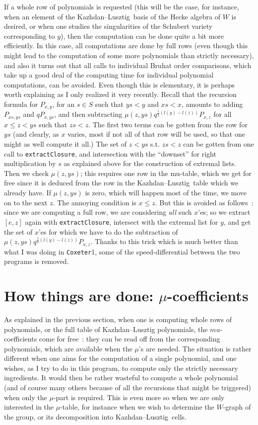 \documentclass[11pt]{article}
\newcommand{\coxeter}{{\tt Coxeter}}
\newcommand{\kl}{Kazh\-dan--Lusz\-tig}
\newcommand{\klpol}{Kazh\-dan--Lusz\-tig po\-ly\-no\-mial}
\begin{document}
If a whole row of polynomials is requested (this will be the case, for 
instance, when an element of the \kl\ basis of the Hecke algebra of $W$ is 
desired, or when one studies the singularities of the Schubert variety
corresponding to $y$), then the computation can be done quite a bit more
efficiently. In this case, all computations are done by full rows (even though
this might lead to the computation of some more polynomials than strictly
necessary), and also it turns out that all calls to individual Bruhat order
comparisons, which take up a good deal of the computing time for individual
polynomial computations, can be avoided. Even though this is elementary, it is 
perhaps worth explaining as I only realized it very recently. Recall that the 
recursion formula for $P_{x,y}$, for an $s\in S$ such that $ys<y$ and $xs<x$, 
amounts to adding $P_{xs,ys}$ and $qP_{x,ys}$, and then subtracting
$\mu(z,ys)q^{\frac{1}{2}(l(y)-l(z))}P_{x,z}$ for all $x\leq z<ys$ such that 
$zs<z$. The first two terms can be gotten from the row for $ys$ (and clearly, 
as $x$ varies, most if not all of that row will be used, so that one might as 
well compute it all.) The set of $z<ys$ s.t. $zs<z$ can be gotten from one call
to {\tt extractClosure}, and intersection with the ``downset'' for right 
multiplication by $s$ as explained above for the construction of extremal 
lists. Then we check $\mu(z,ys)$; this requires one row in the mu-table, which 
we get for free since it is deduced from the row in the \kl\ table which we 
already have. If $\mu(z,ys)$ is zero, which will happen most of the time, we 
move on to the next $z$. The annoying condition is $x\leq z$. But this is 
avoided as follows~: since we are computing a full row, we are considering {\em
all} such $x$'es; so we extract $[e,z]$ again with {\tt extractClosure}, 
intersect with the extremal list for $y$, and get the set of $x$'es for which 
we have to do the subtraction of $\mu(z,ys)q^{\frac{1}{2}(l(y)-l(z))}P_{x,z}$. 
Thanks to this trick which is much better than what I was doing in \coxeter1, 
some of the speed-differential between the two programs is removed.

\section{How things are done: $\mu$-coefficients}\label{section:mucoeffs}

As explained in the previous section, when one is computing whole rows of
polynomials, or the full table of \klpol s, the $mu$-coefficients come for
free~: they can be read off from the corresponding polynomials, which are
available when the $\mu$'s are needed. The situation is rather different
when one aims for the computation of a single polynomial, and one wishes,
as I try to do in this program, to compute only the strictly necessary
ingredients. It would then be rather wasteful to compute a whole polynomial
(and of course many others because of all the recursions that might be
triggered) when only the $\mu$-part is required. This is even more so when
we are only interested in the $\mu$-table, for instance when we wish to
determine the $W$-graph of the group, or its decomposition into \kl\ cells.
\end{document}
